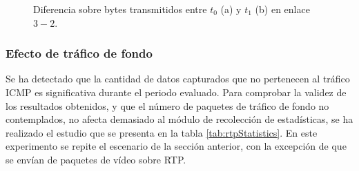 \documentclass[a4paper,11pt]{book}
\begin{document}
\begin{figure}[tb]
\centering
\caption{Diferencia sobre bytes transmitidos entre $t_0$ (a) y $t_1$ (b) en enlace $3-2$.}
\end{figure}


%
\subsubsection{Efecto de tráfico de fondo}\label{sub:estadisticas2}

Se ha detectado que la cantidad de datos capturados que no pertenecen al tráfico \ac{ICMP} es significativa durante el periodo evaluado. Para comprobar la validez de los resultados obtenidos, y que el número de paquetes de tráfico de fondo no contemplados, no afecta demasiado al módulo de recolección de estadísticas, se ha realizado el estudio que se presenta en la tabla \ref{tab:rtpStatistics}. En este experimento se repite el escenario de la sección anterior, con la excepción de que se  envían de paquetes de vídeo sobre \ac{RTP}.
\end{document}
